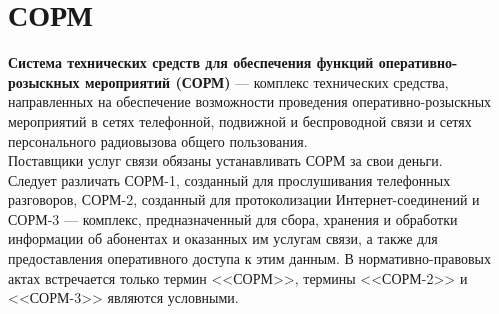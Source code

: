 {\section{СОРМ}
\textbf{Система технических средств для обеспечения функций оперативно-розыскных мероприятий (СОРМ)} --- комплекс технических средства, направленных на обеспечение возможности проведения оперативно-розыскных мероприятий в сетях телефонной, подвижной и беспроводной связи и сетях персонального радиовызова общего пользования.\\
Поставщики услуг связи обязаны устанавливать СОРМ за свои деньги.\\
Следует различать СОРМ-1, созданный для прослушивания телефонных разговоров, СОРМ-2, созданный для протоколизации Интернет-соединений\cite{sorm_12} и СОРМ-3 --- комплекс, предназначенный для сбора, хранения и обработки информации об абонентах и оказанных им услугам связи, а также для предоставления оперативного доступа к этим данным\cite{sorm_3}. В нормативно-правовых актах встречается только термин <<СОРМ>>, термины <<СОРМ-2>> и <<СОРМ-3>> являются условными\cite{sorm_name}.
}
